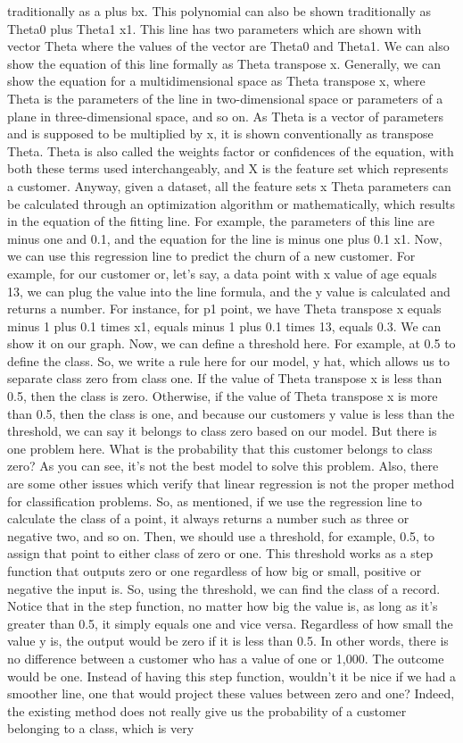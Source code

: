 traditionally as a plus bx. This polynomial can also be shown traditionally as Theta0 plus Theta1 x1. This line has two parameters which are shown with vector Theta where the values of the vector are Theta0 and Theta1. We can also show the equation of this line formally as Theta transpose x. Generally, we can show the equation for a multidimensional space as Theta transpose x, where Theta is the parameters of the line in two-dimensional space or parameters of a plane in three-dimensional space, and so on. As Theta is a vector of parameters and is supposed to be multiplied by x, it is shown conventionally as transpose Theta. Theta is also called the weights factor or confidences of the equation, with both these terms used interchangeably, and X is the feature set which represents a customer. Anyway, given a dataset, all the feature sets x Theta parameters can be calculated through an optimization algorithm or mathematically, which results in the equation of the fitting line. For example, the parameters of this line are minus one and 0.1, and the equation for the line is minus one plus 0.1 x1. Now, we can use this regression line to predict the churn of a new customer. For example, for our customer or, let's say, a data point with x value of age equals 13, we can plug the value into the line formula, and the y value is calculated and returns a number. For instance, for p1 point, we have Theta transpose x equals minus 1 plus 0.1 times x1, equals minus 1 plus 0.1 times 13, equals 0.3. We can show it on our graph. Now, we can define a threshold here. For example, at 0.5 to define the class. So, we write a rule here for our model, y hat, which allows us to separate class zero from class one. If the value of Theta transpose x is less than 0.5, then the class is zero. Otherwise, if the value of Theta transpose x is more than 0.5, then the class is one, and because our customers y value is less than the threshold, we can say it belongs to class zero based on our model. But there is one problem here. What is the probability that this customer belongs to class zero? As you can see, it's not the best model to solve this problem. Also, there are some other issues which verify that linear regression is not the proper method for classification problems. So, as mentioned, if we use the regression line to calculate the class of a point, it always returns a number such as three or negative two, and so on. Then, we should use a threshold, for example, 0.5, to assign that point to either class of zero or one. This threshold works as a step function that outputs zero or one regardless of how big or small, positive or negative the input is. So, using the threshold, we can find the class of a record. Notice that in the step function, no matter how big the value is, as long as it's greater than 0.5, it simply equals one and vice versa. Regardless of how small the value y is, the output would be zero if it is less than 0.5. In other words, there is no difference between a customer who has a value of one or 1,000. The outcome would be one. Instead of having this step function, wouldn't it be nice if we had a smoother line, one that would project these values between zero and one? Indeed, the existing method does not really give us the probability of a customer belonging to a class, which is very 